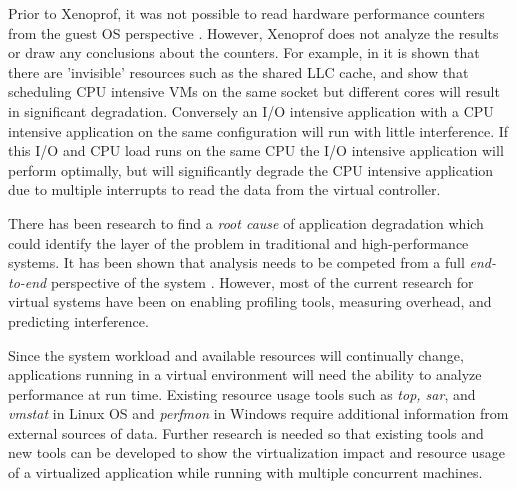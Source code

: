 \indent Prior to Xenoprof, it was not possible to read hardware performance counters from the guest OS perspective \cite{menon, du2}.  However, Xenoprof does not analyze the results or draw any conclusions about the counters.  For example, in \cite{tickoo} it is shown that there are 'invisible' resources such as the shared LLC cache, and show that scheduling CPU intensive VMs on the same socket but different cores will result in significant degradation.  Conversely an I/O intensive application with a CPU intensive application on the same configuration will run with little interference.  If this I/O and CPU load runs on the same CPU the I/O intensive application will perform optimally, but will significantly degrade the CPU intensive application due to multiple interrupts to read the data from the virtual controller.

\indent There has been research to find a \emph{root cause} of application degradation which could identify the layer of the problem in traditional \cite{traeger} and high-performance \cite{knapp1} systems.  It has been shown that analysis needs to be competed from a full \emph{end-to-end} perspective of the system \cite{saltzer, gupta1}.  However, most of the current research for virtual systems have been on enabling profiling tools, measuring overhead, and predicting interference.  

\indent Since the system workload and available resources will continually change, applications running in a virtual environment will need the ability to analyze performance at run time.  
Existing resource usage tools such as \emph{top, sar}, and \emph{vmstat} in Linux OS and \emph{perfmon} in Windows require additional information from external sources of data.  
Further research is needed so that existing tools and new tools can be developed to show the virtualization impact and resource usage of a virtualized application while running with multiple concurrent machines.
